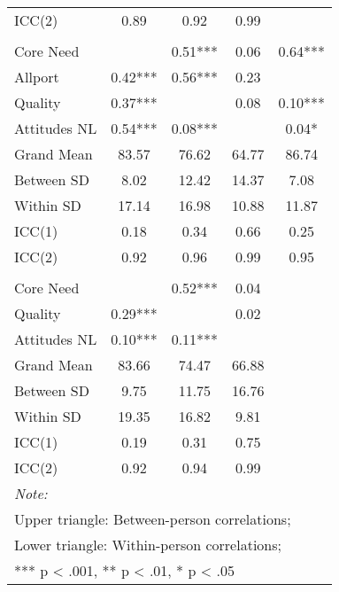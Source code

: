 \begin{table}
\begin{minipage}[t][\textheight][t]{\textwidth}
{\begin{tabular}[t]{lcccc}
\hspace{1em}ICC(2) & 0.89 & 0.92 & 0.99 & \\
\addlinespace[0.3em]
\multicolumn{5}{l}{\textbf{Study 3}}\\
\hspace{1em}Core Need &  & 0.51*** & 0.06 & 0.64***\\
\hspace{1em}Allport & 0.42*** & 0.56*** & 0.23 & \\
\hspace{1em}Quality & 0.37*** &  & 0.08 & 0.10***\\
\hspace{1em}Attitudes NL & 0.54*** & 0.08*** &  & 0.04*\\
\addlinespace
\hspace{1em}Grand Mean & 83.57 & 76.62 & 64.77 & 86.74\\
\hspace{1em}Between SD & 8.02 & 12.42 & 14.37 & 7.08\\
\hspace{1em}Within SD & 17.14 & 16.98 & 10.88 & 11.87\\
\hspace{1em}ICC(1) & 0.18 & 0.34 & 0.66 & 0.25\\
\hspace{1em}ICC(2) & 0.92 & 0.96 & 0.99 & 0.95\\
\addlinespace[0.3em]
\multicolumn{5}{l}{\textbf{Across Studies}}\\
\hspace{1em}Core Need &  & 0.52*** & 0.04 & \\
\hspace{1em}Quality & 0.29*** &  & 0.02 & \\
\hspace{1em}Attitudes NL & 0.10*** & 0.11*** &  & \\
\addlinespace
\hspace{1em}Grand Mean & 83.66 & 74.47 & 66.88 & \\
\hspace{1em}Between SD & 9.75 & 11.75 & 16.76 & \\
\hspace{1em}Within SD & 19.35 & 16.82 & 9.81 & \\
\hspace{1em}ICC(1) & 0.19 & 0.31 & 0.75 & \\
\hspace{1em}ICC(2) & 0.92 & 0.94 & 0.99 & \\
\bottomrule
\multicolumn{5}{l}{\rule{0pt}{1em}\textit{Note: }}\\
\multicolumn{5}{l}{\rule{0pt}{1em}Upper triangle: Between-person correlations;}\\
\multicolumn{5}{l}{\rule{0pt}{1em}Lower triangle: Within-person correlations;}\\
\multicolumn{5}{l}{\rule{0pt}{1em}*** p < .001, ** p < .01,  * p < .05}\\
\end{tabular}}
\end{minipage}
\end{table}
